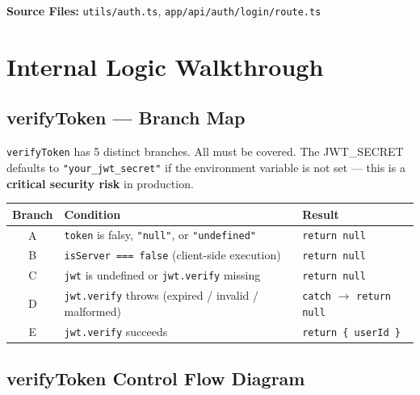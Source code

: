 \documentclass[12pt,a4paper]{report}
\begin{document}
\textbf{Source Files:} \texttt{utils/auth.ts}, \texttt{app/api/auth/login/route.ts}

\section{Internal Logic Walkthrough}

\subsection{verifyToken --- Branch Map}

\begin{tcolorbox}[warningbox, title={Security Critical Function}]
\texttt{verifyToken} has 5 distinct branches. All must be covered. The JWT\_SECRET
defaults to \texttt{"your\_jwt\_secret"} if the environment variable is not set ---
this is a \textbf{critical security risk} in production.
\end{tcolorbox}

\begin{center}
\begin{tabular}{clp{7cm}}
  \toprule
  \textbf{Branch} & \textbf{Condition} & \textbf{Result} \\
  \midrule
  A & \texttt{token} is falsy, \texttt{"null"}, or \texttt{"undefined"} & \texttt{return null} \\
  B & \texttt{isServer === false} (client-side execution) & \texttt{return null} \\
  C & \texttt{jwt} is undefined or \texttt{jwt.verify} missing & \texttt{return null} \\
  D & \texttt{jwt.verify} throws (expired / invalid / malformed) & \texttt{catch} $\to$ \texttt{return null} \\
  E & \texttt{jwt.verify} succeeds & \texttt{return \{ userId \}} \\
  \bottomrule
\end{tabular}
\end{center}

\subsection{verifyToken Control Flow Diagram}
\end{document}
